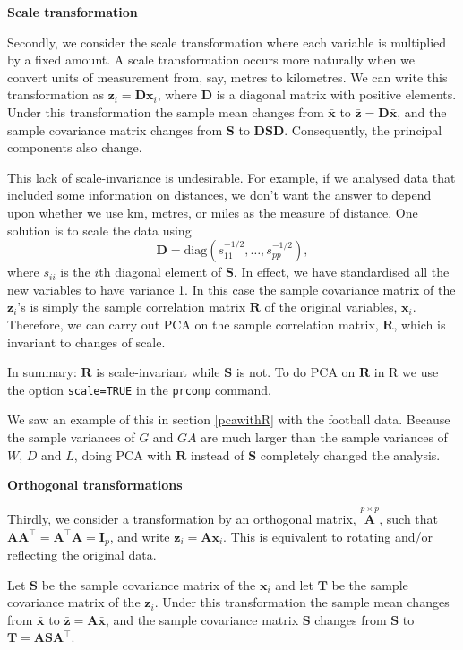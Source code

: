 \documentclass[
]{book}
\theoremstyle{definition}
\theoremstyle{definition}
\theoremstyle{definition}
\theoremstyle{definition}
\theoremstyle{remark}
\begin{document}
\textbf{Scale transformation}

Secondly, we consider the scale transformation where each variable is multiplied by a fixed amount.
A scale transformation occurs more naturally when we convert units of measurement from, say, metres to kilometres. We can write this transformation as \(\mathbf z_i = \mathbf D\mathbf x_i\), where \(\mathbf D\) is a diagonal matrix with positive elements. Under this transformation the sample mean changes from \(\bar{\mathbf x}\) to \(\bar{\mathbf z} = \mathbf D\bar{\mathbf x}\), and the sample covariance matrix changes from \(\mathbf S\) to \(\mathbf D\mathbf S\mathbf D\). Consequently, the principal components also change.

This lack of scale-invariance is undesirable. For example, if we analysed data that included some information on distances, we don't want the answer to depend upon whether we use km, metres, or miles as the measure of distance.
One solution is to scale the data using
\[
\mathbf D= \text{diag}(s_{11}^{-1/2}, \ldots , s_{pp}^{-1/2}),
 \]
where \(s_{ii}\) is the \(i\)th diagonal element of \(\mathbf S\). In effect, we have standardised all the new variables to have variance 1. In this case the sample covariance matrix of the \(\mathbf z_i\)'s is simply the sample correlation matrix \(\mathbf R\) of the original variables, \(\mathbf x_i\). Therefore, we can carry out PCA on the sample correlation matrix, \(\mathbf R\), which is invariant to changes of scale.

In summary: \(\mathbf R\) is scale-invariant while \(\mathbf S\) is not. To do PCA on \(\mathbf R\) in R we use the option \texttt{scale=TRUE} in the \texttt{prcomp} command.

We saw an example of this in section \ref{pcawithR} with the football data. Because the sample
variances of \(G\) and \(GA\) are much larger than the sample variances of \(W\), \(D\) and \(L\), doing PCA with \(\mathbf R\) instead of \(\mathbf S\) completely changed the analysis.

\textbf{Orthogonal transformations}

Thirdly, we consider a transformation by an orthogonal matrix, \(\stackrel{p \times p}{\mathbf A}\), such that \(\mathbf A\mathbf A^\top = \mathbf A^\top \mathbf A= \mathbf I_p\), and write \(\mathbf z_i = \mathbf A\mathbf x_i\). This is equivalent to rotating and/or reflecting the original data.

Let \(\mathbf S\) be the sample covariance matrix of the \(\mathbf x_i\) and let \(\mathbf T\) be the sample covariance matrix of the \(\mathbf z_i\). Under this transformation the sample mean changes from \(\bar{\mathbf x}\) to \(\bar{\mathbf z} = \mathbf A\bar{\mathbf x}\), and the sample covariance matrix \(\mathbf S\) changes from \(\mathbf S\) to \(\mathbf T= \mathbf A\mathbf S\mathbf A^\top\).
\end{document}
